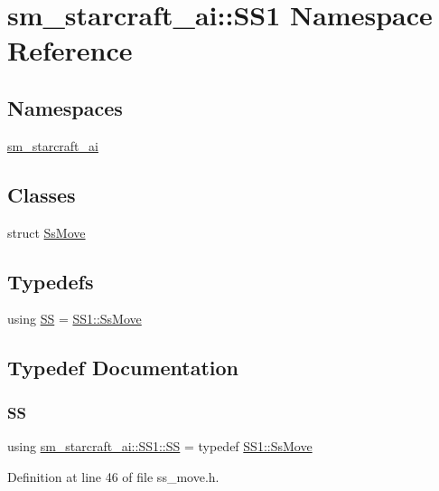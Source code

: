 \hypertarget{namespacesm__starcraft__ai_1_1SS1}{}\section{sm\+\_\+starcraft\+\_\+ai\+:\+:S\+S1 Namespace Reference}
\label{namespacesm__starcraft__ai_1_1SS1}
\subsection*{Namespaces}
\begin{DoxyCompactItemize}
\item 
 \hyperlink{namespacesm__starcraft__ai_1_1SS1_1_1sm__starcraft__ai}{sm\+\_\+starcraft\+\_\+ai}
\end{DoxyCompactItemize}
\subsection*{Classes}
\begin{DoxyCompactItemize}
\item 
struct \hyperlink{structsm__starcraft__ai_1_1SS1_1_1SsMove}{Ss\+Move}
\end{DoxyCompactItemize}
\subsection*{Typedefs}
\begin{DoxyCompactItemize}
\item 
using \hyperlink{namespacesm__starcraft__ai_1_1SS1_a4ff0721435c0672497739bcd032777ca}{SS} = \hyperlink{structsm__starcraft__ai_1_1SS1_1_1SsMove}{S\+S1\+::\+Ss\+Move}
\end{DoxyCompactItemize}


\subsection{Typedef Documentation}
\mbox{\label{namespacesm__starcraft__ai_1_1SS1_a4ff0721435c0672497739bcd032777ca}} 
\subsubsection{\texorpdfstring{SS}{SS}}
{\footnotesize\ttfamily using \hyperlink{namespacesm__starcraft__ai_1_1SS1_a4ff0721435c0672497739bcd032777ca}{sm\+\_\+starcraft\+\_\+ai\+::\+S\+S1\+::\+SS} = typedef \hyperlink{structsm__starcraft__ai_1_1SS1_1_1SsMove}{S\+S1\+::\+Ss\+Move}}



Definition at line 46 of file ss\+\_\+move.\+h.

